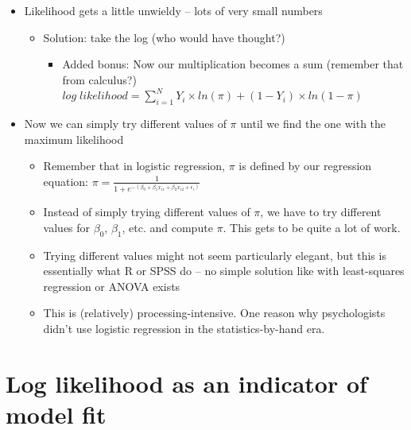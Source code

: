\documentclass[]{article}
\begin{document}
\begin{itemize}
\itemsep1pt\parskip0pt
\item
  Likelihood gets a little unwieldy -- lots of very small numbers

  \begin{itemize}
  \itemsep1pt\parskip0pt
  \item
    Solution: take the log (who would have thought?)

    \begin{itemize}
    \itemsep1pt\parskip0pt
    \item
      Added bonus: Now our multiplication becomes a sum (remember that
      from calculus?)
      $log\;likelihood = \sum_{i = 1}^N Y_i\times ln(\pi) + (1-Y_i)\times ln(1-\pi)$
    \end{itemize}
  \end{itemize}
\item
  Now we can simply try different values of $\pi$ until we find the one
  with the maximum likelihood

  \begin{itemize}
  \itemsep1pt\parskip0pt
  \item
    Remember that in logistic regression, $\pi$ is defined by our
    regression equation:
    $\pi = \frac{1}{1 + e^{-(\beta_0 + \beta_1 x_{i1} + \beta_2 x_{i2} + \epsilon_i)}}$
  \item
    Instead of simply trying different values of $\pi$, we have to try
    different values for $\beta_0$, $\beta_1$, etc. and compute $\pi$.
    This gets to be quite a lot of work.
  \item
    Trying different values might not seem particularly elegant, but
    this is essentially what R or SPSS do -- no simple solution like
    with least-squares regression or ANOVA exists
  \item
    This is (relatively) processing-intensive. One reason why
    psychologists didn't use logistic regression in the
    statistics-by-hand era.
  \end{itemize}
\end{itemize}

\section{Log likelihood as an indicator of model
fit}\label{log-likelihood-as-an-indicator-of-model-fit}
\end{document}
